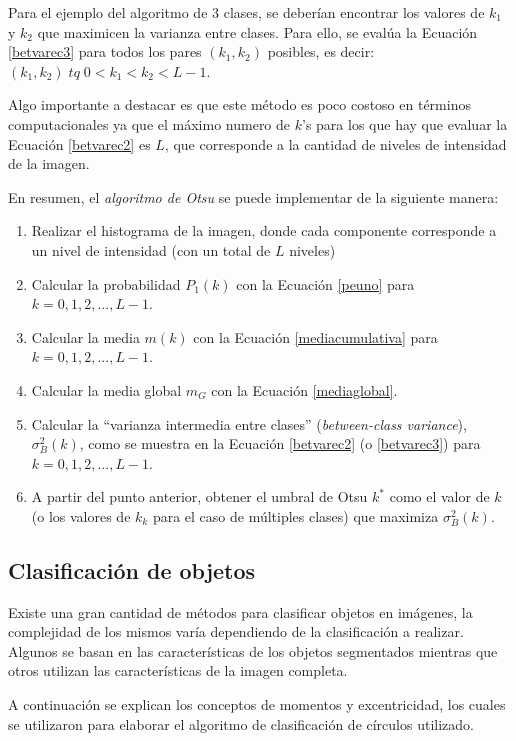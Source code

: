 Para el ejemplo del algoritmo de 3 clases, se deberían encontrar los valores de $k_1$ y $k_2$ que maximicen la varianza entre clases. Para ello, se evalúa la Ecuación \ref{betvarec3} para todos los pares $(k_1,k_2)$ posibles, es decir: $(k_1,k_2) \; tq \; 0<k_1<k_2<L-1$.

Algo importante a destacar es que este método es poco costoso en términos computacionales ya que el máximo numero de $k$'s para los que hay que evaluar la Ecuación \ref{betvarec2} es $L$, que corresponde a la cantidad de niveles de intensidad de la imagen.

En resumen, el \textit{algoritmo de Otsu} se puede implementar de la siguiente manera:
\begin{enumerate}
 \item Realizar el histograma de la imagen, donde cada componente corresponde a un nivel de intensidad (con un total de $L$ niveles)
 \item Calcular la probabilidad $P_1(k)$ con la Ecuación \ref{peuno} para $k=0,1,2,...,L-1$.
 \item Calcular la media $m(k)$ con la Ecuación \ref{mediacumulativa} para $k=0,1,2,...,L-1$.
 \item Calcular la media global $m_G$ con la Ecuación \ref{mediaglobal}.
 \item Calcular la ``varianza intermedia entre clases'' (\textit{between-class variance}), ${\sigma}_B^2(k)$, como se muestra en la Ecuación \ref{betvarec2} (o \ref{betvarec3})  para $k=0,1,2,...,L-1$.
 \item A partir del punto anterior, obtener el umbral de Otsu $k^*$ como el valor de $k$ (o los valores de $k_k$ para el caso de múltiples clases) que maximiza ${\sigma}_B^2(k)$.
\end{enumerate}

\subsection{Clasificación de objetos}

Existe una gran cantidad de métodos para clasificar objetos en imágenes, la complejidad de los mismos varía dependiendo de la clasificación a realizar. Algunos se basan en las características de los objetos segmentados mientras que otros utilizan las características de la imagen completa.

A continuación se explican los conceptos de momentos y excentricidad, los cuales se utilizaron para elaborar el algoritmo de clasificación de círculos utilizado.

